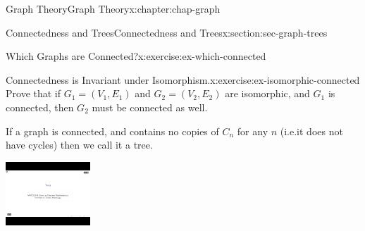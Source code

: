 \documentclass[oneside,10pt,]{book}
\numberwithin{equation}{section}
\newlength{\qrsize}
\newlength{\previewwidth}
\begin{document}
\begin{chapterptx}{Graph Theory}{}{Graph Theory}{}{}{x:chapter:chap-graph}
\begin{sectionptx}{Connectedness and Trees}{}{Connectedness and Trees}{}{}{x:section:sec-graph-trees}
\begin{inlineexercise}{Which Graphs are Connected?}{x:exercise:ex-which-connected}
\begin{sidebyside}{3}{0.0916666666666667}{0.0916666666666667}{0.183333333333333}
\begin{sbspanel}{0.15}
{
}%
\end{sbspanel}%
\end{sidebyside}%
\end{inlineexercise}%
\begin{inlineexercise}{Connectedness is Invariant under Isomorphism.}{x:exercise:ex-isomorphic-connected}%
Prove that if \(G_1 = (V_1,E_1)\) and \(G_2 = (V_2,E_2)\) are isomorphic, and \(G_1\) is connected, then \(G_2\) must be connected as well.%
\end{inlineexercise}%
If a graph is connected, and contains no copies of \(C_n\) for any \(n\) (i.e.\@ it does not have cycles) then we call it a tree.%
\begin{sidebyside}{1}{0}{0}{0}%
\begin{sbspanel}{1}%
\setlength{\qrsize}{9em}
\setlength{\previewwidth}{\linewidth}
\addtolength{\previewwidth}{-\qrsize}
\begin{tcbraster}[raster columns=2, raster column skip=1pt, raster halign=center, raster force size=false, raster left skip=0pt, raster right skip=0pt]%
\begin{tcolorbox}[previewstyle, width=\previewwidth]%
\includegraphics[width=0.80\linewidth,height=\qrsize,keepaspectratio]{images/video-trees.jpg}%
\end{tcolorbox}%

\end{tcbraster}
\end{sbspanel}
\end{sidebyside}
\end{sectionptx}
\end{chapterptx}
\end{document}
